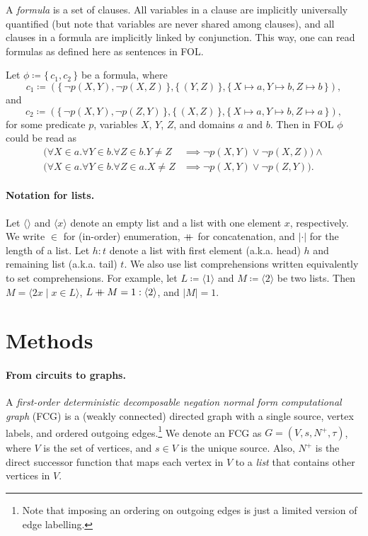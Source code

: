 A \emph{formula} is a set of clauses. All variables in a clause are implicitly
universally quantified (but note that variables are never shared among clauses),
and all clauses in a formula are implicitly linked by conjunction. This way, one
can read formulas as defined here as sentences in FOL.

\begin{example} \label{example:first} Let $\phi \coloneqq \{\, c_1, c_2 \,\}$ be
  a formula, where
  \[
    c_1 \coloneqq (\{\, \neg p(X, Y), \neg p(X, Z) \,\}, \{\, (Y, Z) \,\}, \{\, X \mapsto a, Y \mapsto b, Z \mapsto b \,\}),
  \]
  and
  \[
    c_2 \coloneqq (\{\, \neg p(X, Y), \neg p(Z, Y) \,\}, \{\, (X, Z) \,\}, \{\, X \mapsto a, Y \mapsto b, Z \mapsto a \,\}),
  \]
  for some predicate $p$, variables $X$, $Y$, $Z$, and domains $a$ and $b$. Then
  in FOL $\phi$ could be read as
  \begin{align*}
    (\forall X \in a. \forall Y \in b. \forall Z \in b. Y \ne Z &\implies \neg p(X, Y) \lor \neg p(X, Z)) \land \\
    (\forall X \in a. \forall Y \in b. \forall Z \in a. X \ne Z &\implies \neg p(X, Y) \lor \neg p(Z, Y)).
  \end{align*}
\end{example}

\paragraph{Notation for lists.}
Let $\langle\rangle$ and $\langle x \rangle$ denote an empty list and a list
with one element $x$, respectively. We write $\in$ for (in-order) enumeration,
$\mathbin{+\mkern-10mu+}$ for concatenation, and $|\cdot|$ for the length of a list. Let
$h : t$ denote a list with first element (a.k.a. head) $h$ and remaining list
(a.k.a. tail) $t$. We also use list comprehensions written equivalently to set
comprehensions. For example, let $L \coloneqq \langle 1 \rangle$ and
$M \coloneqq \langle 2 \rangle$ be two lists. Then
$M = \langle 2x \mid x \in L \rangle$,
$L \mathbin{+\mkern-10mu+} M = 1 : \langle 2 \rangle$, and $|M| = 1$.

\section{Methods}


\paragraph{From circuits to graphs.}
A \emph{first-order deterministic decomposable negation normal form
  computational graph} (FCG) is a (weakly connected) directed graph with a
single source, vertex labels, and ordered outgoing edges.\footnote{Note that
  imposing an ordering on outgoing edges is just a limited version of edge
  labelling.} We denote an FCG as $G = (V, s, N^+, \tau)$, where $V$ is the set
of vertices, and $s \in V$ is the unique source. Also, $N^+$ is the direct
successor function that maps each vertex in $V$ to a \emph{list} that contains
other vertices in $V$.

